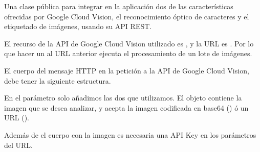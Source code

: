 \begin{fulllineitems}
\label{\detokenize{chapter_two/desc_cloudnao:app.tpa_client_libraries.google_cloud_vision.GoogleCloudVision}}
Una clase pública para integrar en la aplicación dos de las características
ofrecidas por Google Cloud Vision, el reconocimiento óptico de caracteres y
el etiquetado de imágenes, usando su API REST.

El recurso de la API de Google Cloud Vision utilizado es ,
y la URL es
. Por lo que hacer
un  al URL anterior ejecuta el procesamiento de un lote de imágenes.

El cuerpo del mensaje HTTP en la petición a la API de Google Cloud Vision,
debe tener la siguiente estructura.

\begin{sphinxVerbatim}[commandchars=\\\{\}]
   \PYG{p}{[}
       \PYG{p}{[}
           
           
      \PYG{p}{]}
       
         
         
           
  \PYG{p}{]}
\end{sphinxVerbatim}

En el parámetro  solo añadimos las dos que utilizamos. El objeto
 contiene la imagen que se desea analizar, y acepta la imagen codificada
en base64 () ó un URL ().

Además de el cuerpo con la imagen es necesaria una API Key en los parámetros
del URL.


\end{fulllineitems}
